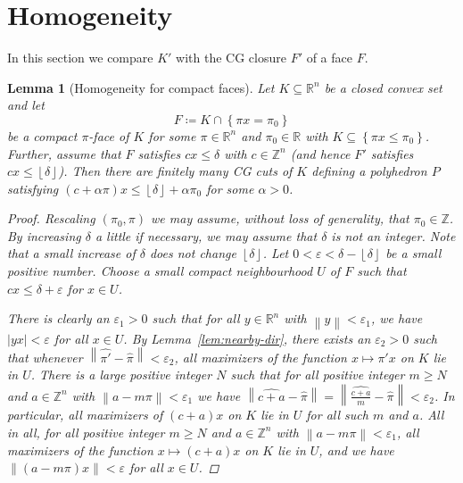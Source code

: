 \documentclass[11pt]{article}
\newtheorem{lem}[thm]{Lemma}
\theoremstyle{remark}
\begin{document}
\section{Homogeneity}
\label{sec:homogeneity}
In this section we compare \(K'\) with the {CG\xspace} closure \(F'\)
of a face \(F\).

\begin{lem}[Homogeneity for compact faces]
  \label{lem:homogeneity}
  Let \(K \subseteq {\mathbb{R}}^n\) be a closed convex set and let
  \[
  F \coloneqq K \cap {\left\{{ \pi x = \pi_0}\right\}}
  \]
  be a compact \(\pi\)-face of \(K\)
  for some \(\pi \in {\mathbb{R}}^{n}\) and \(\pi_0 \in {\mathbb{R}}\)
  with \(K \subseteq {\left\{{\pi x \leq \pi_0 }\right\}}\). 
  Further, assume that \(F\) satisfies \(c x \leq \delta\) with \(c \in
  {\mathbb{Z}}^{n}\) (and hence \(F'\) satisfies \(cx \leq {\left\lfloor{\delta}\right\rfloor}\)).
  Then there are finitely many {CG\xspace} cuts of \(K\)
  defining a polyhedron \(P\) satisfying
  \((c + \alpha \pi) x \leq {\left\lfloor{\delta}\right\rfloor} + \alpha \pi_{0}\)
  for some \(\alpha > 0\).
\begin{proof}
Rescaling \((\pi_0,\pi)\) we may assume, without loss of generality, that \(\pi_{0} \in {\mathbb{Z}}\).
By increasing \(\delta\) a little if necessary,
we may assume that \(\delta\) is not an integer.
Note that a small increase of \(\delta\)
does not change \({\left\lfloor{\delta}\right\rfloor}\).
Let \(0 < \varepsilon < \delta - {\left\lfloor{\delta}\right\rfloor}\) be
a small positive number.
Choose a small compact neighbourhood \(U\) of \(F\)
such that \(c x \leq \delta + \varepsilon\) for \(x \in U\).

There is clearly an \(\varepsilon_{1} > 0\)
such that for all \(y \in {\mathbb{R}}^{n}\)
with \({\left\lVert{y}\right\rVert} < \varepsilon_{1}\),
we have
\({\left|{y x}\right|} < \varepsilon\) for all \(x \in U\).
By Lemma~\ref{lem:nearby-dir},
there exists an \(\varepsilon_{2} > 0\) such that
whenever
\({\left\lVert{{\widehat{{\pi'}}} - {\widehat{{\pi}}}}\right\rVert}
< \varepsilon_{2}\),
all maximizers of the function \(x \mapsto \pi' x\) on \(K\)
lie in \(U\).
There is a large positive integer \(N\)
such that for all positive integer \(m \geq N\)
and \(a \in {\mathbb{Z}}^{n}\)
with \({\left\lVert{a - m \pi}\right\rVert} < \varepsilon_{1}\)
we have
\({\left\lVert{{\widehat{{c+a}}} - {\widehat{{\pi}}}}\right\rVert} = {\left\lVert{{\widehat{{\frac{c+a}{m}}}} - {\widehat{{\pi}}}}\right\rVert}
< \varepsilon_{2}\).
In particular,
all maximizers of \((c + a) x\) on \(K\) lie in \(U\)
for all such \(m\) and \(a\).
All in all,
for all positive integer \(m \geq N\)
and \(a \in {\mathbb{Z}}^{n}\)
with \({\left\lVert{a - m \pi}\right\rVert} < \varepsilon_{1}\),
all maximizers of the function \(x \mapsto (c + a) x\)
on \(K\) lie in \(U\),
and we have \({\left\lVert{(a - m \pi) x}\right\rVert} < \varepsilon\)
for all \(x \in U\).


\end{proof}
\end{lem}
\end{document}
